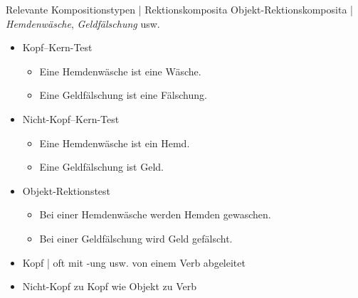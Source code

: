 \begin{frame}
  {Relevante Kompositionstypen | Rektionskomposita}
  \onslide<+->
  Objekt-Rektionskomposita | \textit{Hemdenwäsche}, \textit{Geldfälschung} usw.
  \Halbzeile
  \begin{itemize}[<+->]
    \item Kopf--Kern-Test
      \begin{itemize}[<+->]
        \item Eine Hemdenwäsche ist eine Wäsche. \rot{\Ck}
        \item Eine Geldfälschung ist eine Fälschung. \rot{\Ck}
      \end{itemize}
    \item Nicht-Kopf--Kern-Test
      \begin{itemize}[<+->]
        \item Eine Hemdenwäsche ist ein Hemd. \rot{\Fl}
        \item Eine Geldfälschung ist Geld. \rot{\Fl}
      \end{itemize}
      \Halbzeile
    \item Objekt-Rektionstest
      \begin{itemize}[<+->]
        \item Bei einer Hemdenwäsche werden Hemden gewaschen. \gruen{\Ck}
        \item Bei einer Geldfälschung wird Geld gefälscht. \gruen{\Ck}
      \end{itemize}
      \Halbzeile
    \item Kopf | oft mit \alert{-ung} usw. von einem Verb abgeleitet
    \item Nicht-Kopf zu Kopf wie \alert{Objekt} zu Verb
  \end{itemize}
\end{frame}


